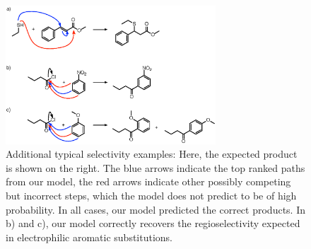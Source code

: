 \begin{figure}[h]
        \centering
        \includegraphics[width=0.7\textwidth]{imgs/textbook/additionalexamples}
        \caption{Additional typical selectivity examples: Here, the expected product is shown on the right. The blue arrows indicate the top ranked paths from our model, the red arrows indicate other possibly competing but incorrect steps, which the model does not predict to be of high probability. In all cases, our model predicted the correct products. In b) and c), our model correctly recovers the regioselectivity expected in electrophilic aromatic substitutions.}
        \label{fig:extra-textbook-example2}
\end{figure}



